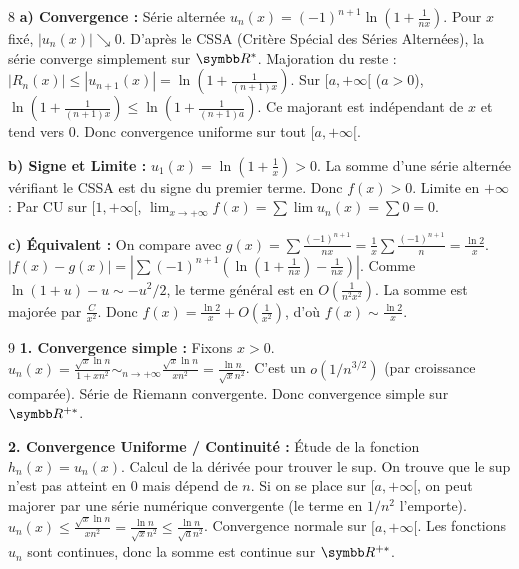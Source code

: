 \begin{correction}{8}
\textbf{a) Convergence :}
Série alternée $u_n(x) = (-1)^{n+1} \ln(1+\frac{1}{nx})$.
Pour $x$ fixé, $|u_n(x)| \searrow 0$. D'après le CSSA (Critère Spécial des Séries Alternées), la série converge simplement sur $\R^*$.
Majoration du reste : $|R_n(x)| \le |u_{n+1}(x)| = \ln(1+\frac{1}{(n+1)x})$.
Sur $[a, +\infty[$ ($a>0$), $\ln(1+\frac{1}{(n+1)x}) \le \ln(1+\frac{1}{(n+1)a})$.
Ce majorant est indépendant de $x$ et tend vers 0.
Donc convergence uniforme sur tout $[a, +\infty[$.

\textbf{b) Signe et Limite :}
$u_1(x) = \ln(1+\frac{1}{x}) > 0$. La somme d'une série alternée vérifiant le CSSA est du signe du premier terme. Donc $f(x) > 0$.
Limite en $+\infty$ : Par CU sur $[1, +\infty[$, $\lim_{x\to+\infty} f(x) = \sum \lim u_n(x) = \sum 0 = 0$.

\textbf{c) Équivalent :}
On compare avec $g(x) = \sum \frac{(-1)^{n+1}}{nx} = \frac{1}{x} \sum \frac{(-1)^{n+1}}{n} = \frac{\ln 2}{x}$.
$|f(x) - g(x)| = \left| \sum (-1)^{n+1} (\ln(1+\frac{1}{nx}) - \frac{1}{nx}) \right|$.
Comme $\ln(1+u) - u \sim -u^2/2$, le terme général est en $O(\frac{1}{n^2 x^2})$.
La somme est majorée par $\frac{C}{x^2}$.
Donc $f(x) = \frac{\ln 2}{x} + O(\frac{1}{x^2})$, d'où $f(x) \sim \frac{\ln 2}{x}$.
\end{correction}

\begin{correction}{9}
\textbf{1. Convergence simple :}
Fixons $x > 0$. $u_n(x) = \frac{\sqrt{x} \ln n}{1+x n^2} \sim_{n\to+\infty} \frac{\sqrt{x} \ln n}{x n^2} = \frac{\ln n}{\sqrt{x} n^2}$.
C'est un $o(1/n^{3/2})$ (par croissance comparée). Série de Riemann convergente.
Donc convergence simple sur $\R^{+*}$.

\textbf{2. Convergence Uniforme / Continuité :}
Étude de la fonction $h_n(x) = u_n(x)$.
Calcul de la dérivée pour trouver le sup.
On trouve que le sup n'est pas atteint en 0 mais dépend de $n$.
Si on se place sur $[a, +\infty[$, on peut majorer par une série numérique convergente (le terme en $1/n^2$ l'emporte).
$u_n(x) \le \frac{\sqrt{x} \ln n}{x n^2} = \frac{\ln n}{\sqrt{x} n^2} \le \frac{\ln n}{\sqrt{a} n^2}$.
Convergence normale sur $[a, +\infty[$.
Les fonctions $u_n$ sont continues, donc la somme est continue sur $\R^{+*}$.
\end{correction}
